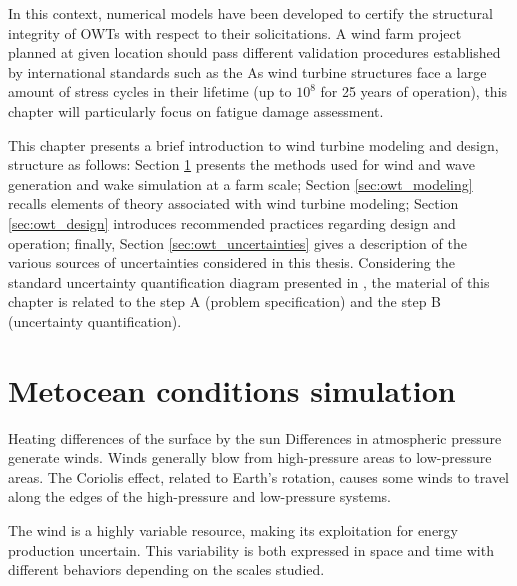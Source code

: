 In this context, numerical models have been developed to certify the structural integrity of OWTs with respect to their solicitations.
A wind farm project planned at given location should pass different validation procedures established by international standards such as the  \citet{iec_2019}
As wind turbine structures face a large amount of stress cycles in their lifetime (up to $10^8$ for 25 years of operation), this chapter will particularly focus on fatigue damage assessment.


This chapter presents a brief introduction to wind turbine modeling and design, structure as follows: 
Section \ref{sec:metocean_simulation} presents the methods used for wind and wave generation and wake simulation at a farm scale; 
Section \ref{sec:owt_modeling} recalls elements of theory associated with wind turbine modeling; 
Section \ref{sec:owt_design} introduces recommended practices regarding design and operation;
finally, Section \ref{sec:owt_uncertainties} gives a description of the various sources of uncertainties considered in this thesis. 
Considering the standard uncertainty quantification diagram presented in , the material of this chapter is related to the step A (problem specification) and the step B (uncertainty quantification). 



\section{Metocean conditions simulation} \label{sec:metocean_simulation}


Heating differences of the surface by the sun
Differences in atmospheric pressure generate winds.
Winds generally blow from high-pressure areas to low-pressure areas.
The Coriolis effect, related to Earth's rotation, causes some winds to travel along the edges of the high-pressure and low-pressure systems.

The wind is a highly variable resource, making its exploitation for energy production uncertain.
This variability is both expressed in space and time with different behaviors depending on the scales studied. 



